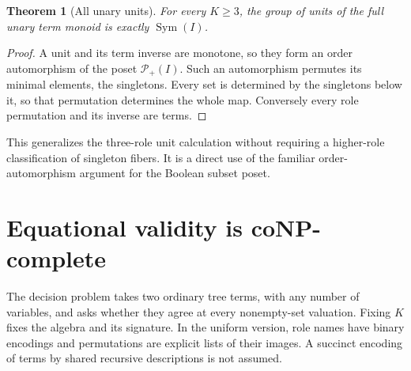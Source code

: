 \documentclass[11pt]{article}
\newtheorem{theorem}{Theorem}[section]
\newcommand{\Pow}{\mathcal P_+}
\newcommand{\Sym}{\operatorname{Sym}}
\begin{document}
\begin{theorem}[All unary units]
For every $K\geq3$, the group of units of the full unary term monoid is
exactly $\Sym(I)$.
\end{theorem}
\begin{proof}
A unit and its term inverse are monotone, so they form an order
automorphism of the poset $\Pow(I)$. Such an automorphism permutes its
minimal elements, the singletons. Every set is determined by the
singletons below it, so that permutation determines the whole map.
Conversely every role permutation and its inverse are terms.
\end{proof}

This generalizes the three-role unit calculation without requiring a
higher-role classification of singleton fibers. It is a direct use of
the familiar order-automorphism argument for the Boolean subset poset.

\section{Equational validity is coNP-complete}

The decision problem takes two ordinary tree terms, with any number of
variables, and asks whether they agree at every nonempty-set valuation.
Fixing $K$ fixes the algebra and its signature. In the uniform version,
role names have binary encodings and permutations are explicit lists of
their images. A succinct encoding of terms by shared recursive
descriptions is not assumed.
\end{document}
